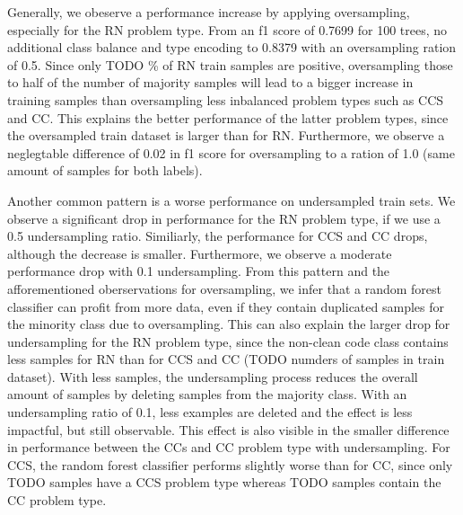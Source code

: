 Generally, we obeserve a performance increase by applying oversampling, especially for the RN problem type. From an f1 score of 0.7699 for 100 trees, no additional class balance and type encoding to 0.8379 with an oversampling ration of 0.5. Since only TODO \% of RN train samples are positive, oversampling those to half of the number of majority samples will lead to a bigger increase in training samples than oversampling less inbalanced problem types such as CCS and CC. This explains the better performance of the latter problem types, since the oversampled train dataset is larger than for RN. Furthermore, we observe a neglegtable difference of 0.02 in f1 score for oversampling to a ration of 1.0 (same amount of samples for both labels).

Another common pattern is a worse performance on undersampled train sets. We observe a significant drop in performance for the RN problem type, if we use a 0.5 undersampling ratio. Similiarly, the performance for CCS and CC drops, although the decrease is smaller. Furthermore, we observe a moderate performance drop with 0.1 undersampling. From this pattern and the afforementioned oberservations for oversampling, we infer that a random forest classifier can profit from more data, even if they contain duplicated samples for the minority class due to oversampling. This can also explain the larger drop for undersampling for the RN problem type, since the non-clean code class contains less samples for RN than for CCS and CC (TODO numders of samples in train dataset). With less samples, the undersampling process reduces the overall amount of samples by deleting samples from the majority class. With an undersampling ratio of 0.1, less examples are deleted and the effect is less impactful, but still observable. This effect is also visible in the smaller difference in performance between the CCs and CC problem type with undersampling. For CCS, the random forest classifier performs slightly worse than for CC, since only TODO samples have a CCS problem type whereas TODO samples contain the CC problem type.

